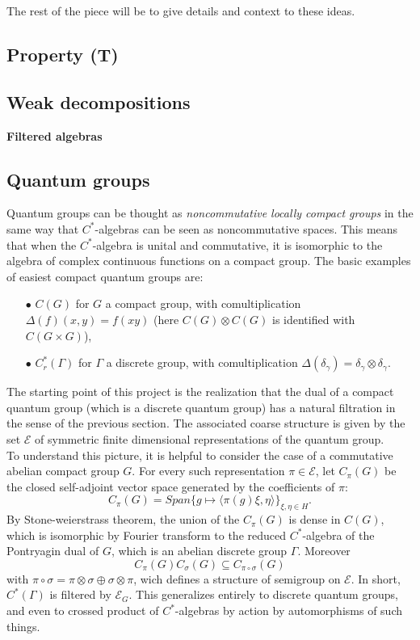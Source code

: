 The rest of the piece will be to give details and context to these ideas.

\subsection{Property (T)}

\subsection{Weak decompositions}

\textbf{Filtered algebras}

\subsection{Quantum groups}

Quantum groups can be thought as \textit{noncommutative locally compact groups} in the same way that $C^*$-algebras can be seen as noncommutative spaces. This means that when the $C^*$-algebra is unital and commutative, it is isomorphic to the algebra of complex continuous functions on a compact group. The basic examples of easiest compact quantum groups are:
\begin{itemize}
\item[$\bullet$] $C(G)$ for $G$ a compact group, with comultiplication $\Delta(f)(x,y)= f(xy)$ (here $C(G)\otimes C(G)$ is identified with $C(G\times G)$),
\item[$\bullet$] $C^*_r(\Gamma)$ for $\Gamma$ a discrete group, with comultiplication $\Delta(\delta_\gamma)= \delta_\gamma \otimes \delta_\gamma$.\\
\end{itemize}     
The starting point of this project is the realization that the dual of a compact quantum group (which is a discrete quantum group) has a natural filtration in the sense of the previous section. The associated coarse structure is given by the set $\mathcal E$ of symmetric finite dimensional representations of the quantum group. \\

To understand this picture, it is helpful to consider the case of a commutative abelian compact group $G$. For every such representation $\pi\in \mathcal E$, let $C_\pi(G)$ be the closed self-adjoint vector space generated by the coefficients of $\pi$:
\[C_\pi(G)  = Span \{ g \mapsto \langle \pi(g)\xi, \eta\rangle\}_{\xi,\eta\in H}.\]
By Stone-weierstrass theorem, the union of the $C_\pi(G)$ is dense in $C(G)$, which is isomorphic by Fourier transform to the reduced $C^*$-algebra of the Pontryagin dual of $G$, which is an abelian discrete group $\Gamma$. Moreover
\[C_\pi(G)C_\sigma(G) \subseteq C_{\pi \circ\sigma}(G)\]
with $\pi \circ\sigma = \pi \otimes\sigma \oplus \sigma \otimes \pi$, wich defines a structure of semigroup on $\mathcal E$. In short, $C^*(\Gamma)$ is filtered by 
$\mathcal E_G$. This generalizes entirely to discrete quantum groups, and even to crossed product of $C^*$-algebras by action by automorphisms of such things. \\

